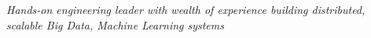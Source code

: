 \begin{cvparagraph}

\vspace{4mm}
\emph{Hands-on engineering leader with wealth of experience building distributed, scalable Big Data, Machine Learning systems}

\end{cvparagraph}
